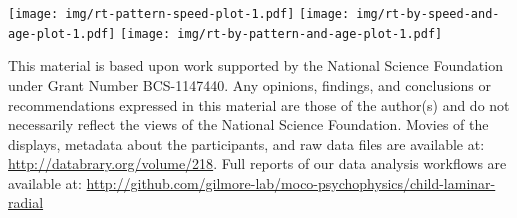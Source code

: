 \documentclass[landscape,final,paperwidth=60in,paperheight=39in,fontscale=0.285]{baposter}
\begin{document}
\begin{poster}
    {
 \begin{center}
 \texttt{[image: img/rt-pattern-speed-plot-1.pdf]}
 \texttt{[image: img/rt-by-speed-and-age-plot-1.pdf]}
 \texttt{[image: img/rt-by-pattern-and-age-plot-1.pdf]}
 \end{center}
}

    {
      This material is based upon work supported by the National Science Foundation under Grant Number BCS-1147440. Any opinions, findings, and conclusions or recommendations expressed in this material are those of the author(s) and do not necessarily reflect the views of the National Science Foundation.
    }
    {
       Movies of the displays, metadata about the participants, and raw data files are available at: \url{http://databrary.org/volume/218}. Full reports of our data analysis workflows are available at: \url{http://github.com/gilmore-lab/moco-psychophysics/child-laminar-radial}
     }

  {
  \tiny
          \renewcommand{\refname}{\vspace{-0.5em}} %
          
          
}
\end{poster}
\end{document}
